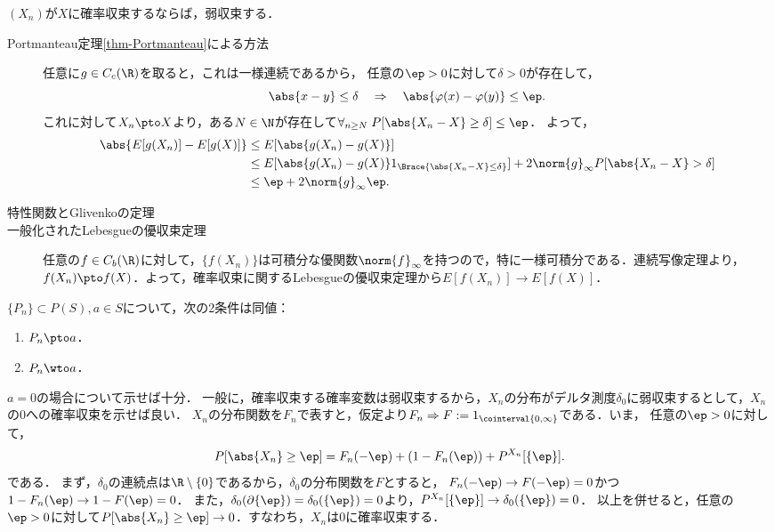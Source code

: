 \documentclass[uplatex,dvipdfmx]{jsreport}
\begin{document}
\begin{proposition}
    $(X_n)$が$X$に確率収束するならば，弱収束する．
\end{proposition}
\begin{Proof}\mbox{}
    \begin{description}
        \item[Portmanteau定理\ref{thm-Portmanteau}による方法] 任意に$g\in C_c(\R)$を取ると，これは一様連続であるから，
        任意の$\ep>0$に対して$\delta>0$が存在して，
        \[\abs{x-y}\le\delta\quad\Rightarrow\quad\abs{\varphi(x)-\varphi(y)}\le\ep.\]
        これに対して$X_n\pto X$より，ある$N\in\N$が存在して$\forall_{n\ge N}\;P[\abs{X_n-X}\ge\delta]\le\ep$．
        よって，
        \begin{align*}
            \abs{E[g(X_n)]-E[g(X)]}&\le E[\abs{g(X_n)-g(X)}]\\
            &\le E[\abs{g(X_n)-g(X)}1_{\Brace{\abs{X_n-X}\le\delta}}]+2\norm{g}_\infty P[\abs{X_n-X}>\delta]\\
            &\le \ep+2\norm{g}_\infty\ep.
        \end{align*}
        \item[特性関数とGlivenkoの定理] 

        \item[一般化されたLebesgueの優収束定理] 任意の$f\in C_b(\R)$に対して，$\{f(X_n)\}$は可積分な優関数$\norm{f}_\infty$を持つので，特に一様可積分である．連続写像定理より，$f(X_n)\pto f(X)$．よって，確率収束に関するLebesgueの優収束定理から$E[f(X_n)]\to E[f(X)]$．
    \end{description}
\end{Proof}

\begin{lemma}[定数への収束は同値]
    $\{P_n\}\subset P(S),a\in S$について，次の2条件は同値：
    \begin{enumerate}
        \item $P_n\pto a$．
        \item $P_n\wto a$．
    \end{enumerate}
\end{lemma}
\begin{Proof}
    $a=0$の場合について示せば十分．
    一般に，確率収束する確率変数は弱収束するから，$X_n$の分布がデルタ測度$\delta_0$に弱収束するとして，$X_n$の$0$への確率収束を示せば良い．
    $X_n$の分布関数を$F_n$で表すと，仮定より$F_n\Rightarrow F:=1_{\cointerval{0,\infty}}$である．いま，
    任意の$\ep>0$に対して，
    \[P[\abs{X_n}\ge\ep]=F_n(-\ep)+(1-F_n(\ep))+P^{X_n}[\{\ep\}].\]
    である．
    まず，$\delta_0$の連続点は$\R\setminus\{0\}$であるから，$\delta_0$の分布関数を$F$とすると，
    $F_n(-\ep)\to F(-\ep)=0$かつ$1-F_n(\ep)\to 1-F(\ep)=0$．
    また，$\delta_0(\partial\{\ep\})=\delta_0(\{\ep\})=0$より，$P^{X_n}[\{\ep\}]\to \delta_0(\{\ep\})=0$．
    以上を併せると，任意の$\ep>0$に対して$P[\abs{X_n}\ge\ep]\to0$．すなわち，$X_n$は$0$に確率収束する．
\end{Proof}
\end{document}
